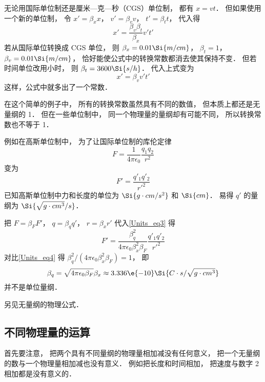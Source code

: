 \begin{example}{}
无论用国际单位制还是厘米—克—秒（CGS）单位制， 都有 $x = vt$． 但如果使用一个新的单位制， 令 $x' = \beta_x x$， $v' = \beta_v v$， $t' = \beta_t t$， 代入得
\begin{equation}
x' = \frac{\beta_v\beta_t}{\beta_x} v' t'
\end{equation}
若从国际单位转换成 CGS 单位， 则 $\beta_x = 0.01 \Si{m/cm}$， $\beta_t = 1$， $\beta_v = 0.01 \Si{m/cm}$， 恰好能使公式中的转换常数都消去使其保持不变． 但若时间单位改用小时， 则 $\beta_t = 3600 \Si{s/h}$． 代入上式变为
\begin{equation}
x' = \beta_v v' t'
\end{equation}
这样，公式中就多出了一个常数．
\end{example}
在这个简单的例子中， 所有的转换常数虽然具有不同的数值， 但本质上都还是无量纲的 1． 但在一些单位制中， 同一个物理量的量纲却有可能不同， 所以转换常数也不等于 1．
\begin{example}{}
例如在高斯单位制中， 为了让国际单位制的库伦定律
\begin{equation}\label{Units_eq3}
F = \frac{1}{4\pi\epsilon_0}\frac{q_1 q_2}{r^2}
\end{equation}
变为
\begin{equation}\label{Units_eq4}
F' = \frac{q'_1 q'_2}{r'^2}
\end{equation}
已知高斯单位制中力和长度的单位为 $\Si{g\cdot cm/s^2}$ 和 $\Si{cm}$． 易得 $q'$ 的量纲为 $\Si{\sqrt{g\cdot cm^3}/s}$．

把 $F = \beta_F F'$， $q = \beta_q q'$， $r = \beta_x r'$ 代入\autoref{Units_eq3} 得
\begin{equation}
F' =  \frac{\beta_q^2}{4\pi\epsilon_0\beta_x^2 \beta_F}\frac{q'_1 q'_2}{r'^2}
\end{equation}
对比\autoref{Units_eq4} 得 $\beta_q^2/(4\pi\epsilon_0\beta_x^2 \beta_F) = 1$， 即
\begin{equation}
\beta_q = \sqrt{4\pi\epsilon_0 \beta_F} \beta_x \approx 3.336\e{-10} \Si{C\cdot s/\sqrt{g\cdot cm^3}}
\end{equation}
并不是单位量纲．
\end{example}

另见无量纲的物理公式．

\subsection{不同物理量的运算}
首先要注意， 把两个具有不同量纲的物理量相加减没有任何意义， 把一个无量纲的数与一个物理量相加减也没有意义． 例如把长度和时间相加， 把速度与数字 2 相加都是没有意义的．

